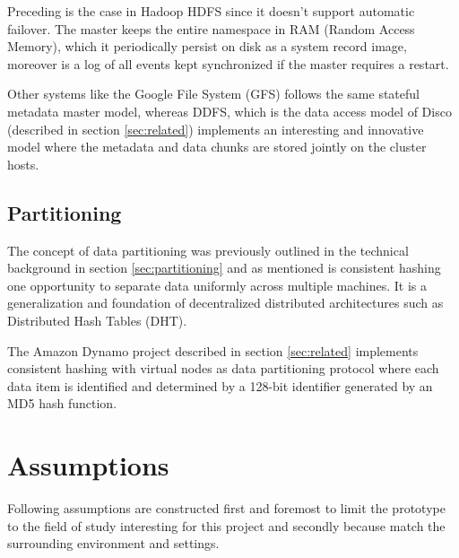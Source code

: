 Preceding is the case in Hadoop HDFS since it doesn't support automatic failover. The master keeps the entire namespace in RAM (Random Access Memory), which it periodically persist on disk as a system record image, moreover is a log of all events kept synchronized if the master requires a restart.
\newline

Other systems like the Google File System (GFS) follows the same stateful metadata master model, whereas DDFS, which is the data access model of Disco (described in section \ref{sec:related}) implements an interesting and innovative model where the metadata and data chunks are stored jointly on the cluster hosts.
\vspace*{3mm}

\subsection*{Partitioning}
The concept of data partitioning was previously outlined in the technical background in section \ref{sec:partitioning} and as mentioned is consistent hashing one opportunity to separate data uniformly across multiple machines. It is a generalization and foundation of decentralized distributed architectures such as Distributed Hash Tables (DHT). 

The Amazon Dynamo project described in section \ref{sec:related} implements consistent hashing with virtual nodes as data partitioning protocol where each data item is identified and determined by a 128-bit identifier generated by an MD5 hash function.

\section{Assumptions}
Following assumptions are constructed first and foremost to limit the prototype to the field of study interesting for this project and secondly because match the surrounding environment and settings.

